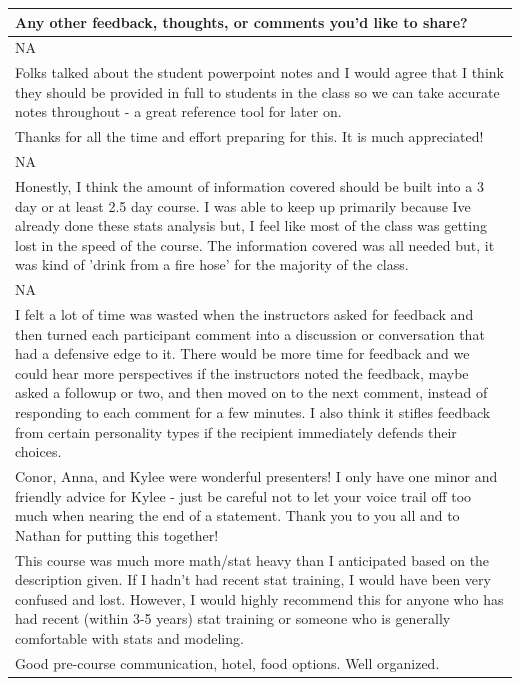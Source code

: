 \documentclass[]{article}
\begin{document}
\begin{table}[H]
\centering
\begin{tabular}{l}
\hline
Any other feedback, thoughts, or comments you'd like to share?\\
\hline
NA\\
\hline
Folks talked about the student powerpoint notes and I would agree that I think they should be provided in full to students in the class so we can take accurate notes throughout - a great reference tool for later on.\\
\hline
Thanks for all the time and effort preparing for this.  It is much appreciated!\\
\hline
NA\\
\hline
Honestly, I think the amount of information covered should be built into a 3 day or at least 2.5 day course. I was able to keep up primarily because Ive already done these stats analysis but, I feel like most of the class was getting lost in the speed of the course. The information covered was all needed but, it was kind of 'drink from a fire hose' for the majority of the class.\\
\hline
NA\\
\hline
I felt a lot of time was wasted when the instructors asked for feedback and then turned each participant comment into a discussion or conversation that had a defensive edge to it. There would be more time for feedback and we could hear more perspectives if the instructors noted the feedback, maybe asked a followup or two, and then moved on to the next comment, instead of responding to each comment for a few minutes. I also think it stifles feedback from certain personality types if the recipient immediately defends their choices.\\
\hline
Conor, Anna, and Kylee were wonderful presenters!  I only have one minor and friendly advice for Kylee - just be careful not to let your voice trail off too much when nearing the end of a statement.  
Thank you to you all and to Nathan for putting this together!\\
\hline
This course was much more math/stat heavy than I anticipated based on the description given. If I hadn't had recent stat training, I would have been very confused and lost. However, I would highly recommend this for anyone who has had recent (within 3-5 years) stat training or someone who is generally comfortable with stats and modeling.\\
\hline
Good pre-course communication, hotel, food options. Well organized.\\

\end{tabular}
\end{table}
\end{document}
